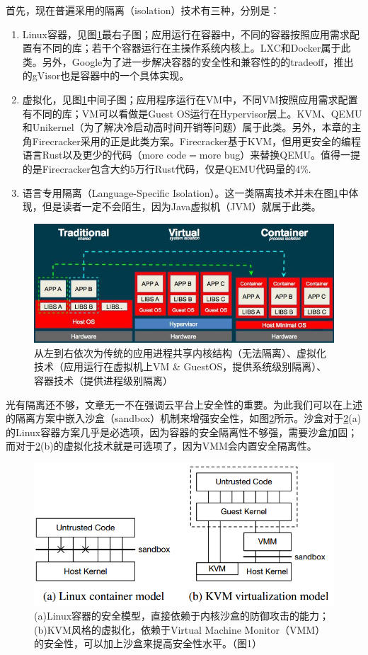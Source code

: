 \documentclass[11pt]{article}
\begin{document}
首先，现在普遍采用的隔离（isolation）技术有三种，分别是\cite{agache2020firecracker}：
\begin{enumerate}
	\item Linux容器，见图\ref{figs:isolation}最右子图；应用运行在容器中，不同的容器按照应用需求配置有不同的库；若干个容器运行在主操作系统内核上。LXC和Docker属于此类。另外，Google为了进一步解决容器的安全性和兼容性的的tradeoff，推出的gVisor也是容器中的一个具体实现。
	\item 虚拟化，见图\ref{figs:isolation}中间子图；应用程序运行在VM中，不同VM按照应用需求配置有不同的库；VM可以看做是Guest OS运行在Hypervisor层上。KVM、QEMU和Unikernel（为了解决冷启动高时间开销等问题）属于此类。另外，本章的主角Firecracker采用的正是此类方案。Firecracker基于KVM，但用更安全的编程语言Rust以及更少的代码（more code$ = $more bug）来替换QEMU。值得一提的是Firecracker包含大约5万行Rust代码，仅是QEMU代码量的4\%.
	\item 语言专用隔离（Language-Specific Isolation）。这一类隔离技术并未在图\ref{figs:isolation}中体现，但是读者一定不会陌生，因为Java虚拟机（JVM）就属于此类。
\end{enumerate}
\begin{figure}[!htbp]
	\centering
	\includegraphics[width=0.8\linewidth]{figs/isolation}
	\caption{从左到右依次为传统的应用进程共享内核结构（无法隔离）、虚拟化技术（应用运行在虚拟机上VM \& GuestOS，提供系统级别隔离）、容器技术（提供进程级别隔离）}
	\label{figs:isolation}
\end{figure}
光有隔离还不够，文章\cite{hellerstein2018serverless,jonas2019cloud}无一不在强调云平台上安全性的重要。为此我们可以在上述的隔离方案中嵌入沙盒（sandbox）机制来增强安全性，如图\ref{figs:sandbox}所示。沙盒对于\ref{figs:sandbox}(a)的Linux容器方案几乎是必选项，因为容器的安全隔离性不够强，需要沙盒加固；而对于\ref{figs:sandbox}(b)的虚拟化技术就是可选项了，因为VMM会内置安全隔离性。
\begin{figure}[!htbp]
	\centering
	\includegraphics[width=0.5\linewidth]{figs/sandbox}
	\caption{(a)Linux容器的安全模型，直接依赖于内核沙盒的防御攻击的能力；(b)KVM风格的虚拟化，依赖于Virtual Machine Monitor（VMM）的安全性，可以加上沙盒来提高安全性水平。（\cite{agache2020firecracker}图1）}
	\label{figs:sandbox}
\end{figure}
\end{document}
